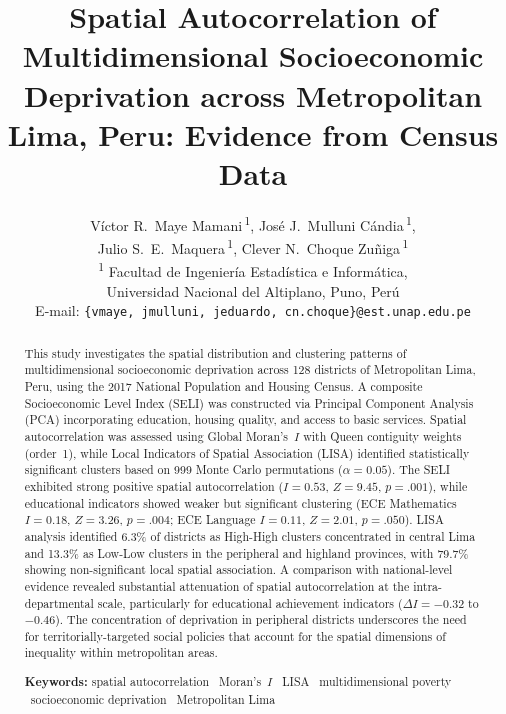 \documentclass[12pt,a4paper,twoside]{article}
\title{\textbf{Spatial Autocorrelation of Multidimensional Socioeconomic Deprivation across Metropolitan Lima, Peru: Evidence from Census Data}}
\author{%
  V\'ictor R.\ Maye Mamani\,\textsuperscript{1},
  Jos\'e J.\ Mulluni C\'andia\,\textsuperscript{1},\\[2pt]
  Julio S.\ E.\ Maquera\,\textsuperscript{1},
  Clever N.\ Choque Zu\~niga\,\textsuperscript{1} \\[6pt]
  \small \textsuperscript{1} Facultad de Ingenier\'ia Estad\'istica e Inform\'atica,\\
  \small Universidad Nacional del Altiplano, Puno, Per\'u \\[4pt]
  \small E-mail: \texttt{\{vmaye, jmulluni, jeduardo, cn.choque\}@est.unap.edu.pe}
}
\date{}
\begin{document}
\maketitle

\begin{abstract}
\noindent
This study investigates the spatial distribution and clustering patterns of
multidimensional socioeconomic deprivation across 128 districts of Metropolitan
Lima, Peru, using the 2017 National Population and Housing Census. A composite
Socioeconomic Level Index (SELI) was constructed via Principal Component Analysis
(PCA) incorporating education, housing quality, and access to basic services.
Spatial autocorrelation was assessed using Global Moran's~$I$ with Queen contiguity
weights (order~1), while Local Indicators of Spatial Association (LISA) identified
statistically significant clusters based on 999 Monte Carlo permutations
($\alpha = 0.05$). The SELI exhibited strong positive spatial autocorrelation
($I = 0.53$, $Z = 9.45$, $p = .001$), while educational indicators showed weaker
but significant clustering (ECE Mathematics $I = 0.18$, $Z = 3.26$, $p = .004$;
ECE Language $I = 0.11$, $Z = 2.01$, $p = .050$). LISA analysis identified 6.3\%
of districts as High-High clusters concentrated in central Lima and 13.3\% as
Low-Low clusters in the peripheral and highland provinces, with 79.7\% showing
non-significant local spatial association. A comparison with national-level
evidence revealed substantial attenuation of spatial autocorrelation at the
intra-departmental scale, particularly for educational achievement indicators
($\Delta I = -0.32$ to $-0.46$). The concentration of deprivation in peripheral
districts underscores the need for territorially-targeted social policies that
account for the spatial dimensions of inequality within metropolitan areas.

\vspace{6pt}
\noindent\textbf{Keywords:} spatial autocorrelation \textbullet\ Moran's~$I$
\textbullet\ LISA \textbullet\ multidimensional poverty \textbullet\ socioeconomic
deprivation \textbullet\ Metropolitan Lima
\end{abstract}

\newpage

\end{document}
